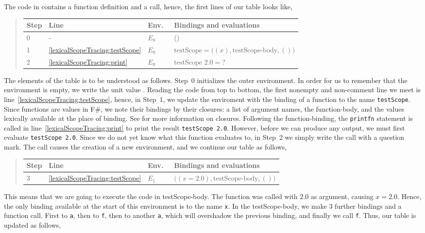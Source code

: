 \documentclass[fsharpNotes.tex]{subfiles}
\begin{document}
The code in  contains a function definition and a call, hence, the first lines of our table looks like,
\begin{quote}
  \begin{tabular*}{0.9\linewidth}{l|lll}
    Step & Line & Env.\ & Bindings and evaluations\\
    \hline
    0 & - & $E_0$ & ()\\
    1 &\ref{lexicalScopeTracing:testScope} & $E_0$ & $\text{testScope} = \big((x), \text{testScope-body}, ()\big)$\\
    2 &\ref{lexicalScopeTracing:print} & $E_0$ & $\text{testScope } 2.0 = \text{?}$
  \end{tabular*}
\end{quote}
The elements of the table is to be understood as follows. Step~0 initializes the outer environment. In order for us to remember that the environment is empty, we write the unit value \lexeme{()}. Reading the code from top to bottom, the first nonempty and non-comment line we meet is line~\ref{lexicalScopeTracing:testScope}, hence, in Step~1, we update the enviroment with the binding of a function to the name \lstinline{testScope}. Since functions are values in F\#, we note their bindings by their closures: a list of argument names, the function-body, and the values lexically available at the place of binding. See  for more information on closures. Following the function-binding, the \lstinline{printfn} statement is called in line~\ref{lexicalScopeTracing:print} to print the result \lstinline{testScope 2.0}. However, before we can produce any output, we must first evaluate \lstinline{testScope 2.0}. Since we do not yet know what this function evaluates to, in Step~2 we simply write the call with a question mark. The call causes the creation of a new environment, and we continue our table as follows,
\begin{quote}
  \begin{tabular*}{0.9\linewidth}{l|lll}
    Step & Line & Env.\ & Bindings and evaluations\\
    \hline
    3 & \ref{lexicalScopeTracing:testScope} & $E_1$ & $\big((x=2.0), \text{testScope-body}, ()\big)$
  \end{tabular*}
\end{quote}
This means that we are going to execute the code in testScope-body. The function was called with $2.0$ as argument, causing $x=2.0$. Hence, the only binding available at the start of this environment is to the name \lstinline{x}. In the testScope-body, we make 3 further bindings and a function call. First to \lstinline{a}, then to \lstinline{f}, then to another \lstinline{a}, which will overshadow the previous binding, and finally we call \lstinline{f}. Thus, our table is updated as follows,
\end{document}
